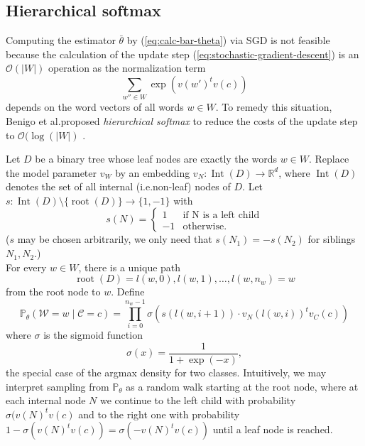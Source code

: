 \documentclass{amsart}
\theoremstyle{plain}
\theoremstyle{definition}
\newcommand{\R}{\mathbb{R}}
\renewcommand{\P}{\mathbb{P}}
\DeclareMathOperator{\Int}{Int}
\DeclareMathOperator{\rootnode}{root}
\begin{document}
\subsection{Hierarchical softmax}
Computing the estimator $\bar \theta$ by (\ref{eq:calc-bar-theta}) via SGD is not feasible because the calculation of the update step (\ref{eq:stochastic-gradient-descent}) is an $\mathcal{O}(|W|)$ operation as the normalization term
\begin{equation}
  \sum\limits_{w'' \in W} \exp(v(w')^t v(c))
\end{equation}
depends on the word vectors of all words $w \in W$.
To remedy this situation, Benigo et al.\@ proposed \emph{hierarchical softmax} to reduce the costs of the update step to $\mathcal{O}(\log(|W|)$ \cite{Morin05hierarchicalprobabilistic}.

Let $D$ be a binary tree whose leaf nodes are exactly the words $w \in W$.
Replace the model parameter $v_W$ by an embedding $v_N : \Int(D) \rightarrow \R^d$, where $\Int(D)$ denotes the set of all internal (i.e.\@ non-leaf) nodes of $D$.
Let $s :\Int(D) \setminus \{\rootnode(D)\} \rightarrow \{1, -1\}$ with 
\begin{equation*}
  s(N) = \begin{cases}
    1 & \text{if N is a left child} \\
    -1 & \text{otherwise.}
      \end{cases}
\end{equation*}
($s$ may be chosen arbitrarily, we only need that $s(N_1) = -s(N_2)$ for siblings $N_1, N_2$.) \\
For every $w \in W$, there is a unique path 
\begin{equation*}
  \rootnode(D) = l(w, 0), l(w, 1), \dots, l(w, n_w) = w
\end{equation*}
from the root node to $w$.
Define
\begin{equation}
  \P_\theta(\mathcal{W} = w \mid \mathcal{C} = c) = \prod_{i = 0}^{n_w - 1} \sigma \left(s(l(w, i + 1)) \cdot v_N(l(w, i))^t v_C(c) \right)
\end{equation}
where $\sigma$ is the sigmoid function
\begin{equation*}
  \sigma(x) = \frac{1}{1 + \exp(-x)},
\end{equation*}
the special case of the argmax density for two classes.
Intuitively, we may interpret sampling from $\P_\theta$ as a random walk starting at the root node, where at each internal node $N$ we continue to the left child with probability $\sigma(v(N)^t v(c)$ and to the right one with probability $1 - \sigma(v(N)^t v(c)) = \sigma(- v(N)^t v(c))$ until a leaf node is reached.
\end{document}
